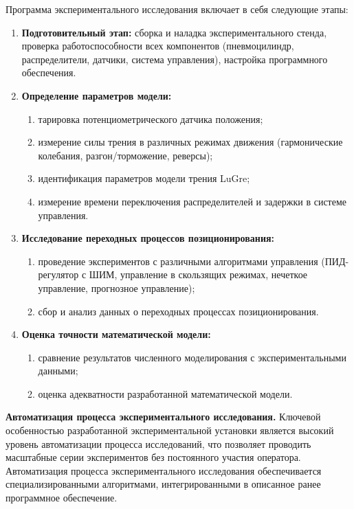 Программа экспериментального исследования включает в себя следующие этапы:
\begin{enumerate}
	\item \textbf{Подготовительный этап:} сборка и наладка экспериментального стенда, проверка работоспособности
	      всех компонентов (пневмоцилиндр, распределители, датчики, система управления), настройка программного обеспечения.
	\item \textbf{Определение параметров модели:}
	      \begin{enumerate}
		      \item тарировка потенциометрического датчика положения;
		      \item измерение силы трения в различных режимах движения (гармонические колебания, разгон/торможение, реверсы);
		      \item идентификация параметров модели трения LuGre;
		      \item измерение времени переключения распределителей и задержки в системе управления.
	      \end{enumerate}
	\item \textbf{Исследование переходных процессов позиционирования:}
	      \begin{enumerate}
		      \item проведение экспериментов с различными алгоритмами управления (ПИД-регулятор с ШИМ,
		            управление в скользящих режимах, нечеткое управление, прогнозное управление);
		      \item сбор и анализ данных о переходных процессах позиционирования.
	      \end{enumerate}
	\item \textbf{Оценка точности математической модели:}
	      \begin{enumerate}
		      \item сравнение результатов численного моделирования с экспериментальными данными;
		      \item оценка адекватности разработанной математической модели.
	      \end{enumerate}
\end{enumerate}

\textbf{Автоматизация процесса экспериментального исследования.}
Ключевой особенностью разработанной экспериментальной установки является высокий уровень автоматизации процесса
исследований, что позволяет проводить масштабные серии экспериментов без постоянного участия оператора.
Автоматизация процесса экспериментального исследования обеспечивается специализированными
алгоритмами, интегрированными в описанное ранее программное обеспечение.

